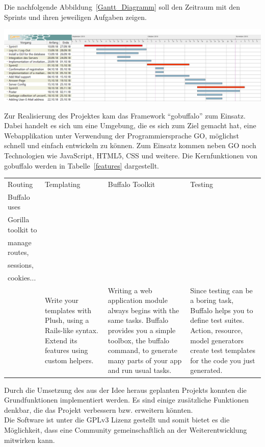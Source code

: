 \documentclass[landscape,a0paper,fontscale=0.35]{baposter} %
\begin{document}
\begin{poster}
{	Die nachfolgende Abbildung~\ref{Gantt_Diagramm} soll den Zeitraum mit den Sprints und ihren jeweiligen Aufgaben zeigen.
	\begin{center}
		\includegraphics[width=0.7\linewidth]{GanttDiagramm.PNG}
		\label{Gantt_Diagramm}
	\end{center}
}


{
	Zur Realisierung des Projektes kam das Framework \enquote{gobuffalo} zum Einsatz. Dabei handelt es sich um eine Umgebung, die es sich zum Ziel gemacht hat, eine Webapplikation unter Verwendung der Programmiersprache GO, möglichst schnell und einfach entwickeln zu können. Zum Einsatz kommen neben GO noch Technologien wie JavaScript, HTML5, CSS und weitere. Die Kernfunktionen von gobuffalo werden in Tabelle~\ref{features} dargestellt.
	\begin{center}
		\begin{tabu}{ l l l l }
			Routing & Templating & Buffalo Toolkit & Testing \\
			\tabucline[1pt]{-}
			Buffalo uses\\ Gorilla toolkit to\\ manage routes,\\ sessions,\\ cookies...\\ & Write your templates with Plush, using a Rails-like syntax. Extend its features using custom helpers. & Writing a web application module always begins with the same tasks. Buffalo provides you a simple toolbox, the buffalo command, to generate many parts of your app and run usual tasks. & Since testing can be a boring task, Buffalo helps you to define test suites. Action, resource, model generators create test templates for the code you just generated.
		\end{tabu}
	\label{features}
	\end{center}
}


{
	Durch die Umsetzung des aus der Idee heraus geplanten Projekts konnten die Grundfunktionen implementiert werden. Es sind einige zusätzliche Funktionen denkbar, die das Projekt verbessern bzw. erweitern könnten.\\
	Die Software ist unter die GPLv3 Lizenz gestellt und somit bietet es die Möglichkeit, dass eine Community gemeinschaftlich an der Weiterentwicklung mitwirken kann.

}
\end{poster}
\end{document}
